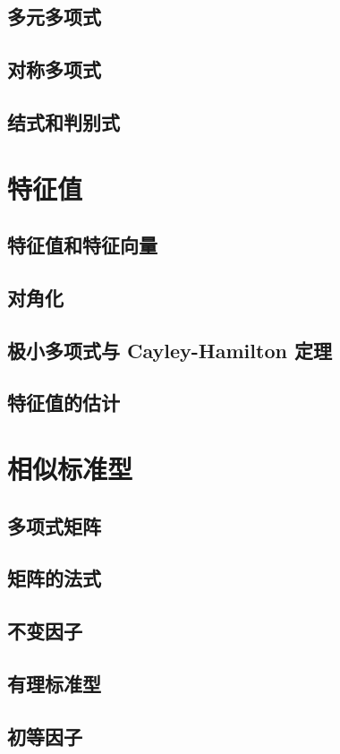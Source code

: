 \documentclass[a4paper, 11pt]{ctexbook}
\begin{document}
        \section{多元多项式}
        \section{对称多项式}
        \section{结式和判别式}
    \chapter{特征值}
        \section{特征值和特征向量}
        \section{对角化}
        \section{极小多项式与 Cayley-Hamilton 定理}
        \section{特征值的估计}
    \chapter{相似标准型}
        \section{多项式矩阵}
        \section{矩阵的法式}
        \section{不变因子}
        \section{有理标准型}
        \section{初等因子}
\end{document}
